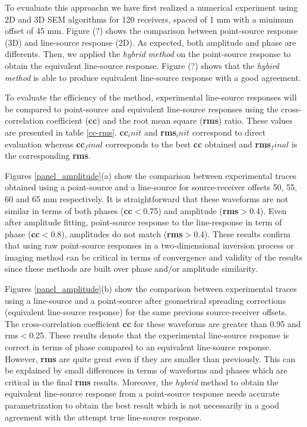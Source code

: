\documentclass[manuscript,revised]{geophysics}
\newcommand{\twod}{two-dimensional }
\begin{document}
\noindent To evualuate this approachn we have first realized a numerical experiment using 2D and 3D SEM algorithms for 120 receivers, spaced of 1 mm with a minimum offset of 45 mm. Figure (?) shows the comparison between point-source response (3D) and line-source response (2D). As expected, both amplitude and phase are differents. Then, we applied the \textit{hybrid method} \citep{Forbriger_LSS_2014;Schafer_LSS_2014} on the point-source response to obtain the equivalent line-source response. Figure (?) shows that the \textit{hybird method} is able to produce equivalent line-source response with a good agreement.

\noindent To evaluate the efficiency of the method, experimental line-source responses will be compared to point-source and equivalent line-source responses using the cross-correlation coefficient (\textbf{cc}) and the root mean square (\textbf{rms}) ratio. These values are presented in table \ref{cc-rms}. \textbf{cc}$_init$ and \textbf{rms}$_init$ correspond to direct evaluation whereas \textbf{cc}$_final$ corresponds to the best \textbf{cc} obtained and \textbf{rms}$_final$ is the corresponding \textbf{rms}.

\noindent Figures \ref{panel_amplitude}(a) show the comparison between experimental traces obtained using a point-source and a line-source for source-receiver offsets 50, 55, 60 and 65 mm respectively. It is straightforward that these waveforms are not similar in terms of both phases (\textbf{cc}$<$0.75) and amplitude (\textbf{rms}$>$0.4). Even after amplitude fitting, point-source response to the line-response in term of phase (\textbf{cc}$<$0.8), amplitudes do not match (\textbf{rms}$>$0.4). These results confirm that using raw point-source responses in a \twod inversion process or imaging method can be critical in terms of convergence and validity of the results since these methods are built over phase and/or amplitude similarity.

\noindent Figures \ref{panel_amplitude}(b) show the comparison between experimental traces using a line-source and a point-source after geometrical spreading corrections (equivalent line-source response) for the same previous source-receiver offsets. The cross-correlation coefficient \textbf{cc} for these waveforms are greater than 0.95 and rms$<$0.25. These results denote that the experimental line-source response is correct in terms of phase compared to an equivalent line-source response. However, \textbf{rms} are quite great even if they are smaller than previously. This can be explained by small differences in terms of waveforms and phases which are critical in the final \textbf{rms} results. Moreover, the \textit{hybrid} method to obtain the equivalent line-source response from a point-source response needs accurate parametrization to obtain the best result which is not necessarily in a good agreement with the attempt true line-source response.   
\end{document}
